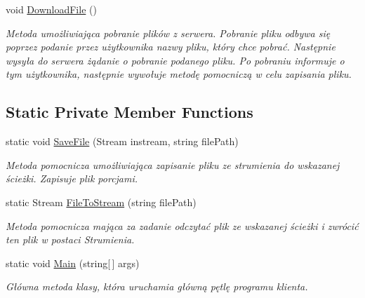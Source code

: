 \begin{DoxyCompactItemize}
void \hyperlink{class_wcf_stream_service_client_1_1_client_a8344bf9cc6cdb22a11d6f86240d7ed3d}{Download\+File} ()
\begin{DoxyCompactList}\small\item\em Metoda umożliwiająca pobranie plików z serwera. Pobranie pliku odbywa się poprzez podanie przez użytkownika nazwy pliku, który chce pobrać. Następnie wysyła do serwera żądanie o pobranie podanego pliku. Po pobraniu informuje o tym użytkownika, następnie wywołuje metodę pomocniczą w celu zapisania pliku. \end{DoxyCompactList}\end{DoxyCompactItemize}
\subsection*{Static Private Member Functions}
\begin{DoxyCompactItemize}
\item 
static void \hyperlink{class_wcf_stream_service_client_1_1_client_ac54e9d85bbd737536ca281cedfc8d87c}{Save\+File} (Stream instream, string file\+Path)
\begin{DoxyCompactList}\small\item\em Metoda pomocnicza umożliwiająca zapisanie pliku ze strumienia do wskazanej ścieżki. Zapisuje plik porcjami. \end{DoxyCompactList}\item 
static Stream \hyperlink{class_wcf_stream_service_client_1_1_client_a9a86790db59d7ada6ba7c67d470904dc}{File\+To\+Stream} (string file\+Path)
\begin{DoxyCompactList}\small\item\em Metoda pomocnicza mająca za zadanie odczytać plik ze wskazanej ścieżki i zwrócić ten plik w postaci Strumienia. \end{DoxyCompactList}\item 
static void \hyperlink{class_wcf_stream_service_client_1_1_client_a6d53a06adb60957a2c84413f13d54b4f}{Main} (string\mbox{[}$\,$\mbox{]} args)
\begin{DoxyCompactList}\small\item\em Główna metoda klasy, która uruchamia główną pętlę programu klienta. \end{DoxyCompactList}\end{DoxyCompactItemize}
